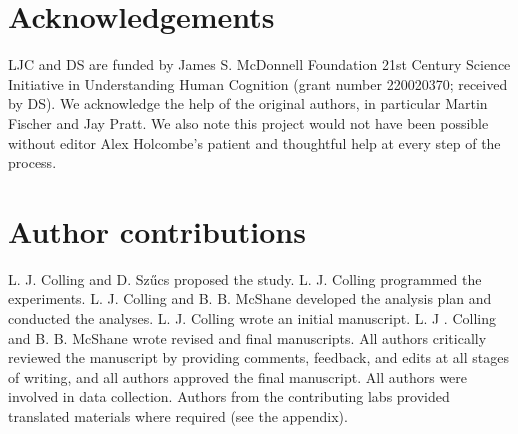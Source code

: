 \documentclass[man,floatsintext]{apa6}
\theoremstyle{definition}
\theoremstyle{definition}
\theoremstyle{definition}
\theoremstyle{remark}
\begin{document}
\section{Acknowledgements}\label{acknowledgements}

LJC and DS are funded by James S. McDonnell Foundation 21st Century
Science Initiative in Understanding Human Cognition (grant number
220020370; received by DS). We acknowledge the help of the original
authors, in particular Martin Fischer and Jay Pratt. We also note this
project would not have been possible without editor Alex Holcombe's
patient and thoughtful help at every step of the process.

\section{Author contributions}\label{author-contributions}

L. J. Colling and D. Szűcs proposed the study. L. J. Colling programmed
the experiments. L. J. Colling and B. B. McShane developed the analysis
plan and conducted the analyses. L. J. Colling wrote an initial
manuscript. L. J . Colling and B. B. McShane wrote revised and final
manuscripts. All authors critically reviewed the manuscript by providing
comments, feedback, and edits at all stages of writing, and all authors
approved the final manuscript. All authors were involved in data
collection. Authors from the contributing labs provided translated
materials where required (see the appendix).

\printbibliography[title=References]

\clearpage
\makeatletter
\efloat@restorefloats
\makeatother
\end{document}
